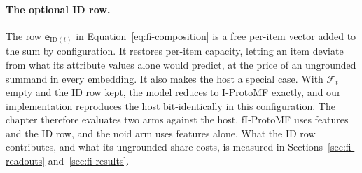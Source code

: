 \paragraph{The optional ID row.} The row $\mathbf{e}_{\mathrm{ID}(t)}$
in Equation~\ref{eq:fi-composition} is a free per-item vector added to
the sum by configuration. It restores per-item capacity, letting an item
deviate from what its attribute values alone would predict, at the price
of an ungrounded summand in every embedding. It also makes the host a
special case. With $\mathcal{F}_t$ empty and the ID row kept, the model
reduces to I-ProtoMF exactly, and our implementation reproduces the host
bit-identically in this configuration. The chapter therefore evaluates
two arms against the host. fI-ProtoMF uses features and the ID row,
and the noid arm uses features alone. What the ID row
contributes, and what its ungrounded share costs, is measured in
Sections~\ref{sec:fi-readouts} and~\ref{sec:fi-results}.
